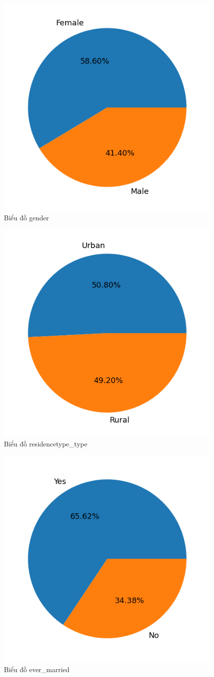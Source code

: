 \documentclass[11pt]{article}
\begin{document}
	\begin{figure}[H]
		\centering
		\includegraphics[width=0.5\linewidth]{genderPie}
		\caption{Biểu đồ gender}
		\label{fig:genderpie}
	\end{figure}
	
	\begin{figure}[H]
		\centering
		\includegraphics[width=0.5\linewidth]{residencePie}
		\caption{Biểu đồ residencetype\_type}
		\label{fig:residencepie}
	\end{figure}
	
	\begin{figure}[H]
		\centering
		\includegraphics[width=0.5\linewidth]{marriedPie}
		\caption{Biểu đồ ever\_married}
		\label{fig:marriedpie}
	\end{figure}
	
\end{document}
